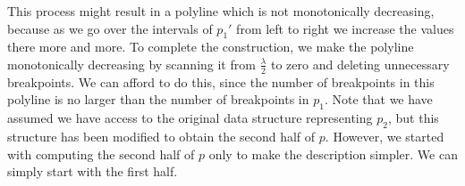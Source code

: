 \documentclass[a4paper,UKenglish]{lipics-v2016}
\theoremstyle{plain}
\begin{document}
This process might result in a polyline which is not monotonically decreasing, because as we go over the intervals of $p_1'$ from left to right we increase the values there more and more.
To complete the construction, we make the polyline monotonically decreasing by scanning it from $\frac{\lambda}{2}$ to zero and deleting unnecessary breakpoints. We can afford to do this, since the number of breakpoints in this polyline is no larger than the number of breakpoints in $p_1$.
%
Note that we have assumed we have access to the original data structure representing $p_{2}$, but this structure has been  modified to obtain the second half of $p$. However, we started with computing the second half of $p$ only to make the description simpler. We can simply start with the first half.

\end{document}
